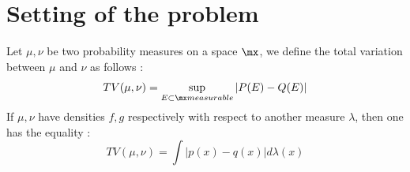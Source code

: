 \section{Setting of the problem} 
\begin{definition}
    Let $\mu,\nu$ be two probability measures on a space $\mx$, we define the total variation between $\mu$ and $\nu$ as follows : 
    \begin{equation*}
        TV(\mu,\nu) = \sup_{E \subset \mx measurable} \left|P(E)-Q(E) \right| 
    \end{equation*}
    If $\mu,\nu$ have densities $f,g$ respectively with respect to another measure $\lambda$, then one has the equality : 
    \begin{equation*}
        TV(\mu,\nu) = \int \left|p(x)-q(x)\right| d\lambda(x)
    \end{equation*}
\end{definition}

